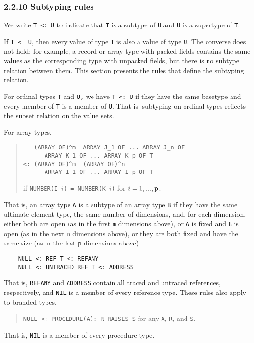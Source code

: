 \documentclass[10pt]{article}
\begin{document}
\subsubsection*{2.2.10 Subtyping rules}

We write \verb|T <: U| to indicate that \verb|T| is a subtype of \verb|U| and
\verb|U| is a supertype of \verb|T|.

If \verb|T <: U|, then every value of type \verb|T| is also a value of type
\verb|U|.  The converse does not hold: for example, a record or array type
with packed fields contains the same values as the corresponding type with
unpacked fields, but there is no subtype relation between them.  This section
presents the rules that define the subtyping relation.

For ordinal types \verb|T| and \verb|U,| we have \verb|T <: U| if they have
the same basetype and every member of \verb|T| is a member of \verb|U|.  That
is, subtyping on ordinal types reflects the subset relation on the value sets.

For array types,
\begin{quote}
\begin{verbatim}
   (ARRAY OF)^m  ARRAY J_1 OF ... ARRAY J_n OF
      ARRAY K_1 OF ... ARRAY K_p OF T
<: (ARRAY OF)^m  (ARRAY OF)^n
      ARRAY I_1 OF ... ARRAY I_p OF T
\end{verbatim}
  if \verb|NUMBER(I_|$i$\verb|) = NUMBER(K_|$i$\verb|)|
  for $i = 1, ..., \verb|p|$.
\end{quote}
That is, an array type \verb|A| is a subtype of an array type \verb|B| if they
have the same ultimate element type, the same number of dimensions, and, for
each dimension, either both are open (as in the first \verb|m| dimensions
above), or \verb|A| is fixed and \verb|B| is open (as in the next \verb|n|
dimensions above), or they are both fixed and have the same size (as in the
last \verb|p| dimensions above).

\begin{verbatim}
    NULL <: REF T <: REFANY
    NULL <: UNTRACED REF T <: ADDRESS
\end{verbatim}
That is, \verb|REFANY| and \verb|ADDRESS| contain all traced and untraced
references, respectively, and \verb|NIL| is a member of every reference type.
These rules also apply to branded types.

\begin{quote}
  \verb|NULL <: PROCEDURE(A): R RAISES S| for any \verb|A|, \verb|R|, and
  \verb|S|.
\end{quote}
That is, \verb|NIL| is a member of every procedure type.
\end{document}
